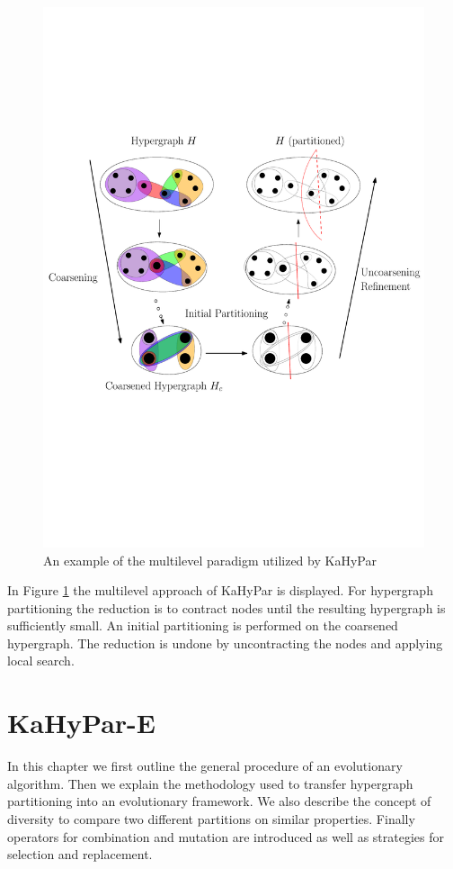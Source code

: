 \documentclass[a4paper,12pt,titlepage, BCOR7mm,headsepline]{scrbook}
\numberwithin{equation}{section}
\begin{document}
\begin{figure}[H]
    \vspace*{-.25cm}
  \centering
   \includegraphics[width=.8\textwidth]{Ipe/Memetic_process.pdf}
  \caption{An example of the multilevel paradigm utilized by KaHyPar}\label{fig:coarseningexample} %

\end{figure}
In Figure \ref{fig:coarseningexample} the multilevel approach of KaHyPar is displayed. For hypergraph partitioning the reduction is to contract nodes until the resulting hypergraph is sufficiently small. An initial partitioning is performed on the coarsened hypergraph. The reduction is undone by uncontracting the nodes and applying local search.



\chapter{KaHyPar-E}
\label{chapter:kahypare}
In this chapter we first outline the general procedure of an evolutionary algorithm. Then we explain the methodology used to transfer hypergraph partitioning into an evolutionary framework. We also describe the concept of diversity to compare two different partitions on similar properties. Finally operators for combination and mutation are introduced as well as strategies for selection and replacement.
\end{document}
